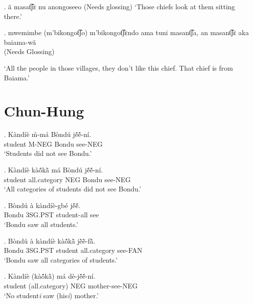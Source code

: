 \documentclass{assets/fieldnotes}
\begin{document}
\exg. ã masat͡ʃɛ nu anongoseeo
(Needs glossing)
`Those chiefs look at them sitting there.'

\exg. mwemimbe (m'bikongot͡ʃo) m'bikongot͡ʃɛndo ama tuni masant͡ʃa, an masant͡ʃɛ aka baiama-wã\\
(Needs Glossing)

`All the people in those villages, they don't like this chief. That chief is from Baiama.'

   

\section{Chun-Hung}


\exg. K\`{a}nd\'{i}\`{e} \`{m}-m\'{a} B\`{o}nd\'{u} jẽ́ẽ́-n\'{i}. \\
student M-NEG Bondu see-NEG \\
`Students did not see Bondu.'

\exg. K\`{a}nd\'{i}\`{e} k\`{a}ṍkã̀  m\'{a} B\`{o}nd\'{u} jẽ́ẽ́-n\'{i}. \\
student all.category NEG Bondu see-NEG \\
`All categories of students did not see Bondu.' 

\exg. B\`{o}nd\'{u} \`{a} k\`{a}nd\'{i}\`{e}-gb\'{e} jẽ́ẽ́. \\
Bondu 3SG.PST student-all see \\
`Bondu saw all students.'

\exg. B\`{o}nd\'{u} \`{a} k\`{a}nd\'{i}\`{e} k\`{a}ṍkã̀  jẽ̀ẽ̀-fã̀. \\
Bondu 3SG.PST student all.category see-FAN \\
`Bondu saw all categories of students.'


 \newline

\exg. K\`{a}nd\'{i}\`{e} (k\`{a}ṍkã̀)  m\'{a} d\`{e}-jẽ́ẽ́-n\'{i}. \\
student (all.category) NEG mother-see-NEG \\
`No student\textit{\scriptsize{i}} saw (his\textit{\scriptsize{i}}) mother.' 
\end{document}
